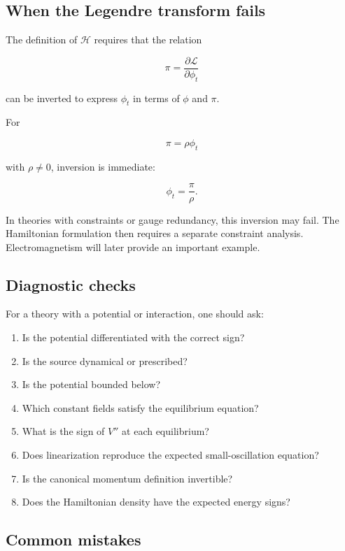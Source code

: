 \subsection{When the Legendre transform fails}

The definition of \(\mathcal{H}\) requires that the relation

\[
\pi
=
\frac{\partial\mathcal{L}}{\partial\phi_{t}}
\]

can be inverted to express \(\phi_{t}\) in terms of \(\phi\) and \(\pi\).

For

\[
\pi=\rho\phi_{t}
\]

with \(\rho\neq0\), inversion is immediate:

\[
\phi_{t}=\frac{\pi}{\rho}.
\]

In theories with constraints or gauge redundancy, this inversion may fail. The Hamiltonian formulation then requires a separate constraint analysis. Electromagnetism will later provide an important example.

\subsection{Diagnostic checks}

For a theory with a potential or interaction, one should ask:

\begin{enumerate}
    \item Is the potential differentiated with the correct sign?
    \item Is the source dynamical or prescribed?
    \item Is the potential bounded below?
    \item Which constant fields satisfy the equilibrium equation?
    \item What is the sign of \(V''\) at each equilibrium?
    \item Does linearization reproduce the expected small-oscillation equation?
    \item Is the canonical momentum definition invertible?
    \item Does the Hamiltonian density have the expected energy signs?
\end{enumerate}

\subsection{Common mistakes}

